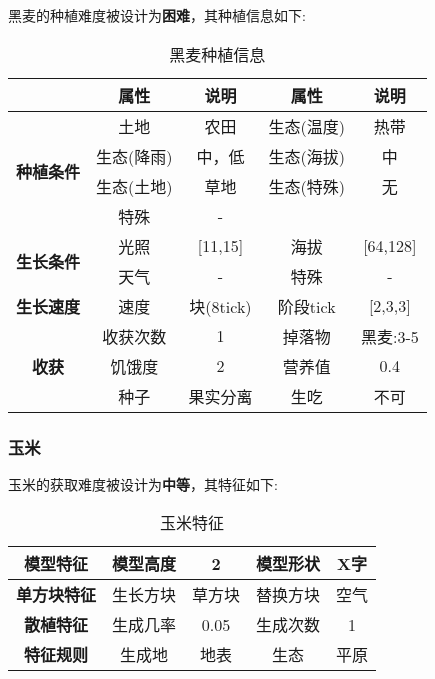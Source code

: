 黑麦的种植难度被设计为\textbf{困难}，其种植信息如下:

\begin{table}[H]
    \centering
    \caption{黑麦种植信息}
    \label{table:黑麦种植信息}
    \setlength{\tabcolsep}{4mm}
    \begin{tabular}{c|cc|cc}
        \toprule
                                           & \textbf{属性} & \textbf{说明}   & \textbf{属性} & \textbf{说明} \\
        \midrule
        \multirow{4}{*}{\textbf{种植条件}} & 土地          & 农田            & 生态(温度)    & 热带    \\
                                           & 生态(降雨)    & 中，低          & 生态(海拔)    & 中       \\
                                           & 生态(土地)    & 草地            & 生态(特殊)    & 无            \\
                                           & 特殊          & -                                \\
        \midrule
        \multirow{2}{*}{\textbf{生长条件}} & 光照          & [11,15]         & 海拔          & [64,128]      \\
                                           & 天气          & -              & 特殊          & -      \\
        \midrule
        \textbf{生长速度}                  & 速度          & 块(8tick)       & 阶段tick      & [2,3,3]       \\
        \midrule
        \multirow{3}{*}{\textbf{收获}}     & 收获次数      & 1               & 掉落物        & 黑麦:3-5      \\
                                           & 饥饿度        & 2               & 营养值        & 0.4           \\
                                           & 种子          & 果实分离        & 生吃          & 不可          \\
        \bottomrule
    \end{tabular}
\end{table}

\subsubsection{玉米}

玉米的获取难度被设计为\textbf{中等}，其特征如下:
\begin{table}[H]
    \centering
    \caption{玉米特征}
    \label{table:玉米特征}
    \setlength{\tabcolsep}{4mm}
    \begin{tabular}{c|cc|cc}
        \toprule
        \textbf{模型特征}   & 模型高度 & 2      & 模型形状 & X字  \\
        \midrule
        \textbf{单方块特征} & 生长方块 & 草方块 & 替换方块 & 空气 \\
        \midrule
        \textbf{散植特征}   & 生成几率 & 0.05   & 生成次数 & 1    \\
        \midrule
        \textbf{特征规则}   & 生成地   & 地表   & 生态     & 平原 \\
        \bottomrule
    \end{tabular}
\end{table}


